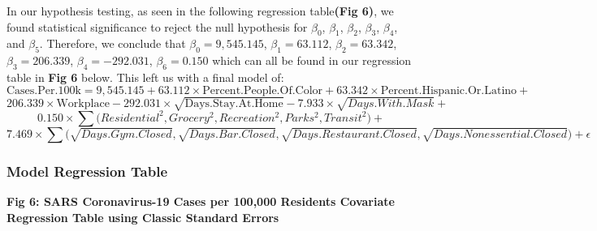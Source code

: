 \documentclass[
]{article}
\begin{document}
In our hypothesis testing, as seen in the following regression
table\textbf{(Fig 6)}, we found statistical significance to reject the
null hypothesis for \(\beta_0\), \(\beta_1\), \(\beta_2\), \(\beta_3\),
\(\beta_4\), and \(\beta_5\). Therefore, we conclude that
\(\beta_0 = 9,545.145\), \(\beta_1 = 63.112\), \(\beta_2 = 63.342\),
\(\beta_3 = 206.339\), \(\beta_4 = -292.031\), \(\beta_6 = 0.150\) which
can all be found in our regression table in \textbf{Fig 6} below. This
left us with a final model of:
\[\text{Cases.Per.100k} = 9,545.145 + 63.112\times\text{Percent.People.Of.Color} + 63.342\times\text{Percent.Hispanic.Or.Latino} +\]
\[206.339 \times \text{Workplace}   -292.031\times\sqrt{\text{Days.Stay.At.Home}} -7.933\times\sqrt{Days.With.Mask} +\]
\[0.150\times\sum\Bigg({Residential^2, Grocery^2,  Recreation^2, Parks^2, Transit^2}\Bigg) +\]
\[7.469\times\sum\Bigg({\sqrt{Days.Gym.Closed} , \sqrt{Days.Bar.Closed} , \sqrt{Days.Restaurant.Closed} , \sqrt{Days.Nonessential.Closed}}\Bigg) +\epsilon\]

\hypertarget{model-regression-table}{%
\subsubsection{Model Regression Table}\label{model-regression-table}}

\textbf{Fig 6: SARS Coronavirus-19 Cases per 100,000 Residents Covariate
Regression Table using Classic Standard Errors}
\end{document}
